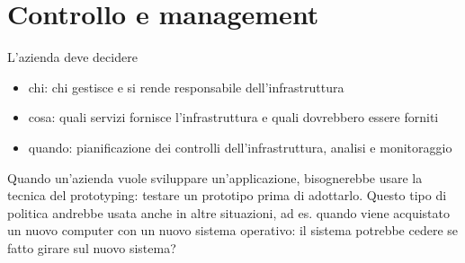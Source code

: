 \section{Controllo e management}
\label{sec:Controllo e management}
L'azienda deve decidere
\begin{itemize}
  \item chi: chi gestisce e si rende responsabile dell'infrastruttura
  \item cosa: quali servizi fornisce l'infrastruttura e quali dovrebbero essere forniti
  \item quando: pianificazione dei controlli dell'infrastruttura, analisi e monitoraggio
\end{itemize}
Quando un'azienda vuole sviluppare un'applicazione, bisognerebbe usare la tecnica del prototyping:
testare un prototipo prima di adottarlo.
Questo tipo di politica andrebbe usata anche in altre situazioni, ad es. quando viene acquistato un
nuovo computer con un nuovo sistema operativo: il sistema potrebbe cedere se fatto girare sul nuovo sistema?
